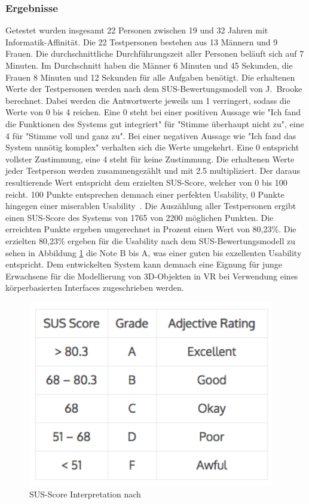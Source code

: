 \subsubsection{Ergebnisse}
Getestet wurden insgesamt 22 Personen zwischen 19 und 32 Jahren mit Informatik-Affinität. Die 22 Testpersonen bestehen aus 13 Männern und 9 Frauen. Die durchschnittliche Durchführungszeit aller Personen beläuft sich auf 7 Minuten. Im Durchschnitt haben die Männer 6 Minuten und 45 Sekunden, die Frauen 8 Minuten und 12 Sekunden für alle Aufgaben benötigt. Die erhaltenen Werte der Testpersonen werden nach dem SUS-Bewertungsmodell von J.~Brooke berechnet. Dabei werden die Antwortwerte jeweils um 1 verringert, sodass die Werte von 0 bis 4 reichen. Eine 0 steht bei einer positiven Aussage wie "Ich fand die Funktionen des Systems gut integriert" für "Stimme überhaupt nicht zu", eine 4 für "Stimme voll und ganz zu". Bei einer negativen Aussage wie "Ich fand das System unnötig komplex" verhalten sich die Werte umgekehrt. Eine 0 entspricht vollster Zustimmung, eine 4 steht für keine Zustimmung. Die erhaltenen Werte jeder Testperson werden zusammengezählt und mit 2.5 multipliziert. Der daraus resultierende Wert entspricht dem erzielten SUS-Score, welcher von 0 bis 100 reicht. 100 Punkte entsprechen demnach einer perfekten Usability, 0 Punkte hingegen einer miserablen Usability~\citep[p.~189-196]{sus}. Die Auszählung aller Testpersonen ergibt einen SUS-Score des Systems von 1765 von 2200 möglichen Punkten. Die erreichten Punkte ergeben umgerechnet in Prozent einen Wert von 80,23\%. Die erzielten 80,23\% ergeben für die Usability nach dem SUS-Bewertungsmodell zu sehen in Abbildung \ref{fig:sus} die Note B bis A, was einer guten bis exzellenten Usability entspricht. Dem entwickelten System kann demnach eine Eignung für junge Erwachsene für die Modellierung von 3D-Objekten in VR bei Verwendung eines körperbasierten Interfaces zugeschrieben werden.

\begin{figure}[h]
\captionsetup{width=.7\linewidth}
\includegraphics[scale=0.75]{Bilder/Hauptteil/susscore}
\centering
\caption{SUS-Score Interpretation nach~\citep{susscore}}
\label{fig:sus}
\end{figure}

